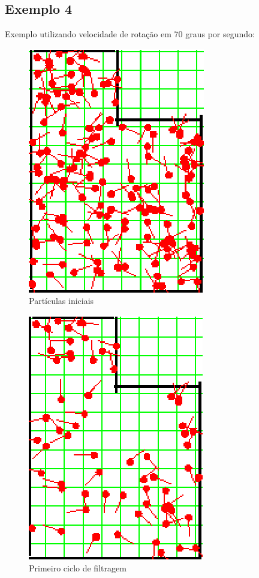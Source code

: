 \subsection{Exemplo 4}

Exemplo utilizando velocidade de rotação em 70 graus por segundo:

\begin{figure}[H]
  \centering
  \includegraphics[scale=0.6]{figuras/cen2_ex4/1.eps}
  \caption[Partículas Iniciais]{Partículas iniciais}
  \label{img:cen2_ex4_1}
\end{figure}

\begin{figure}[H]
  \centering
  \includegraphics[scale=0.6]{figuras/cen2_ex4/2.eps}
  \caption[Primeiro Ciclo de Filtragem]{Primeiro ciclo de filtragem}
  \label{img:cen2_ex4_2}
\end{figure}

